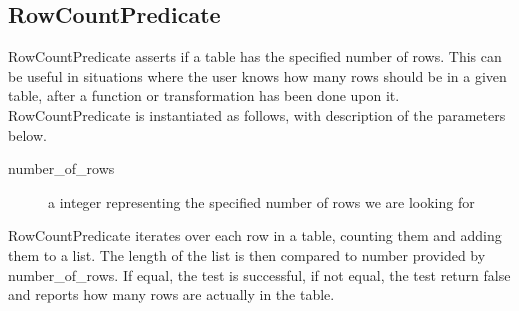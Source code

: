 \subsection{RowCountPredicate}
RowCountPredicate asserts if a table has the specified number of rows. This can be useful in situations where the user knows how many rows should be in a given table, after a function or transformation has been done upon it. RowCountPredicate is instantiated as follows, with description of the parameters below.


\begin{description}
\item [number\_of\_rows] a integer representing the specified number of rows we are looking for
\end{description}

RowCountPredicate iterates over each row in a table, counting them and adding them to a list. The length of the list is then compared to number provided by number\_of\_rows. If equal, the test is successful, if not equal, the test return false and reports how many rows are actually in the table.

